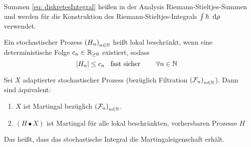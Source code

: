 \begin{*bemerkung}
	Summen \eqref{eq: diskretesIntegral} heißen in der Analysis Riemann-Stieltjes-Summen und werden für die Konstruktion des Riemann-Stieltjes-Integrals $\int h \enskip \mathrm{d}\rho$ verwendet.
\end{*bemerkung}

\begin{*definition}
	Ein stochastischer Prozess $\left( H_n \right)_{n \in \mathbb{N}}$ heißt lokal beschränkt, wenn eine deterministische Folge $c_n \in \mathbb{R}_{\ge 0}$ existiert, sodass
	\begin{equation*}
		\left| H_n \right| \le c_n \enskip \text{ fast sicher } \qquad \forall n \in \mathbb{N}
	\end{equation*}
\end{*definition}

\begin{satz} %
	Sei $X$ adaptierter stochastischer Prozess (bezüglich Filtration $\left( \mathcal{F}_n \right)_{n \in \mathbb{N}}$). Dann sind äquivalent:
	\begin{enumerate}
		\item $X$ ist Martingal bezüglich $\left( \mathcal{F}_n \right)_{n \in \mathbb{N}}$.
		\item $(H \bullet X)$ ist Martingal für alle lokal beschränkten, vorhersbaren Prozesse $H$
	\end{enumerate}
\end{satz}

Das heißt, dass das stochastische Integral die Martingaleigenschaft erhält.


